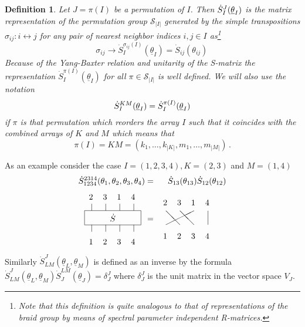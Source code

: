 \documentclass[a4paper,a4paper]{article}
\newtheorem{definition}{Definition}
\begin{document}
\begin{definition}
Let $J=\pi (I)$ be a permutation of $I$. Then $\dot{S}_{I}^{J}(\underline{%
\theta }_{I})$ is the matrix representation of the permutation group $%
\mathcal{S}_{|I|}$ generated by the simple transpositions $\sigma
_{ij}:i\leftrightarrow j$ for any pair of nearest neighbor indices $i,j\in I$
as\footnote{%
Note that this definition is quite analogous to that of representations of
the braid group by means of spectral parameter independent R-matrices.} 
\[
\sigma _{ij}\rightarrow \dot{S}_{I}^{\sigma _{ij}(I)}(\underline{\theta }%
_{I})=\dot{S}_{ij}(\theta _{ij})\, 
\]
Because of the Yang-Baxter relation and unitarity of the S-matrix the
representation $\dot{S}_{I}^{\pi (I)}(\underline{\theta }_{I})$ for all $\pi
\in \mathcal{S}_{|I|}$ is well defined. We will also use the notation 
\[
\dot{S}_{I}^{KM}(\underline{\theta }_{I})=\dot{S}_{I}^{\pi (I)}(\underline{%
\theta }_{I}) 
\]
if $\pi $ is that permutation which reorders the array $I$ such that it
coincides with the combined arrays of $K$ and $M$ which means that 
\[
\pi (I)=KM=(k_{1},\dots ,k_{|K|},m_{1},\dots ,m_{|M|})\,. 
\]
\end{definition}

As an example consider the case $I=(1,2,3,4),K=(2,3)$ and $M=(1,4)$ 
\begin{eqnarray*}
\dot{S}_{1234}^{2314}(\theta _{1},\theta _{2},\theta _{3},\theta _{4}) &=&%
\dot{S}_{13}(\theta _{13})\dot{S}_{12}(\theta _{12}) \\
\begin{array}{l}
\unitlength6mm\begin{picture}(4,4) \put(0,1.5){\framebox(4,1){$\dot S$}}
\put(3.5,1){\line(0,1){.5}} \put(3.5,2.5){\line(0,1){.5}}
\put(.5,1){\line(0,1){.5}} \put(.5,2.5){\line(0,1){.5}}
\put(1.5,1){\line(0,1){.5}} \put(1.5,2.5){\line(0,1){.5}}
\put(2.5,1){\line(0,1){.5}} \put(2.5,2.5){\line(0,1){.5}} \put(.3,.1){1}
\put(1.3,.1){2} \put(2.3,.1){3} \put(3.3,.1){4} \put(.3,3.3){2}
\put(1.3,3.3){3} \put(2.3,3.3){1} \put(3.3,3.3){4} \end{picture}
\end{array}
&=& 
\begin{array}{l}
\unitlength6mm\begin{picture}(4,3) \put(0,1){\line(2,1){2}}
\put(1,1){\line(-1,1){1}} \put(2,1){\line(-1,1){1}} \put(3,1){\line(0,1){1}}
\put(-.2,0){1} \put(0.8,0){2} \put(1.8,0){3} \put(2.8,0){4} \put(-.2,2.4){2}
\put(0.8,2.4){3} \put(1.8,2.4){1} \put(2.8,2.4){4} \end{picture}
\end{array}
\end{eqnarray*}
Similarly $\dot{S}_{LM}^{J}(\underline{\theta }_{L},\underline{\theta }_{M})$
is defined as an inverse by the formula \newline
$\dot{S}_{LM}^{J}(\underline{\theta }_{L},\underline{\theta }_{M})\dot{S}%
_{J}^{LM}(\underline{\theta }_{J})=\delta _{J}^{J}$ where $\delta _{J}^{J}$
is the unit matrix in the vector space $V_{J}$.
\end{document}

